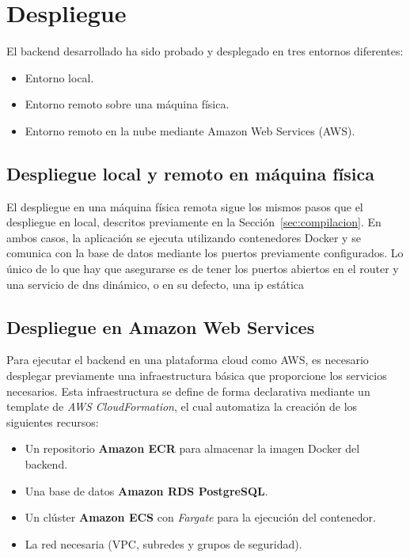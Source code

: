 \section{Despliegue}

El backend desarrollado ha sido probado y desplegado en tres entornos diferentes:

\begin{itemize}
    \item Entorno local.
    \item Entorno remoto sobre una máquina física.
    \item Entorno remoto en la nube mediante Amazon Web Services (AWS).
\end{itemize}

\subsection{Despliegue local y remoto en máquina física}

El despliegue en una máquina física remota sigue los mismos pasos que el despliegue en local, descritos previamente en la Sección~\ref{sec:compilacion}.  
En ambos casos, la aplicación se ejecuta utilizando contenedores Docker y se comunica con la base de datos mediante los puertos previamente configurados.
Lo único de lo que hay que asegurarse es de tener los puertos abiertos en el router y una servicio de dns dinámico, o en su defecto, una ip estática

\subsection{Despliegue en Amazon Web Services}

Para ejecutar el backend en una plataforma cloud como AWS, es necesario desplegar previamente una infraestructura básica que proporcione los servicios necesarios.  
Esta infraestructura se define de forma declarativa mediante un template de \textit{AWS CloudFormation}, el cual automatiza la creación de los siguientes recursos:

\begin{itemize}
    \item Un repositorio \textbf{Amazon ECR} para almacenar la imagen Docker del backend.
    \item Una base de datos \textbf{Amazon RDS PostgreSQL}.
    \item Un clúster \textbf{Amazon ECS} con \textit{Fargate} para la ejecución del contenedor.
    \item La red necesaria (VPC, subredes y grupos de seguridad).
\end{itemize}


